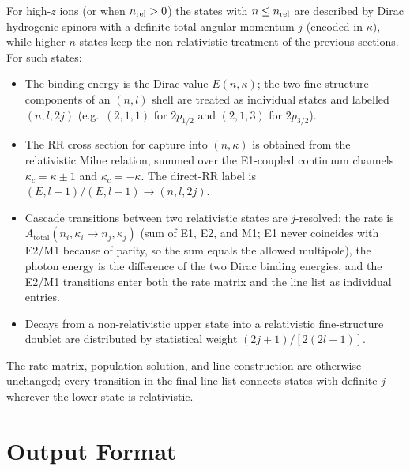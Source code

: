 \documentclass[11pt,a4paper]{article}
\begin{document}
For high-$z$ ions (or when $n_{\rm rel} > 0$) the states with
$n \le n_{\rm rel}$ are described by Dirac hydrogenic spinors with a
definite total angular momentum $j$ (encoded in $\kappa$), while
higher-$n$ states keep the non-relativistic treatment of the previous
sections.  For such states:
\begin{itemize}
\item The binding energy is the Dirac value $E(n,\kappa)$; the two
  fine-structure components of an $(n,l)$ shell are treated as
  individual states and labelled $(n,l,2j)$ (e.g.\ $(2,1,1)$ for
  $2p_{1/2}$ and $(2,1,3)$ for $2p_{3/2}$).
\item The RR cross section for capture into $(n,\kappa)$ is obtained
  from the relativistic Milne relation, summed over the E1-coupled
  continuum channels $\kappa_c = \kappa\pm1$ and $\kappa_c = -\kappa$.
  The direct-RR label is $(E,l{-}1)/(E,l{+}1) \to (n,l,2j)$.
\item Cascade transitions between two relativistic states are
  $j$-resolved: the rate is $A_{\text{total}}(n_i,\kappa_i \to
  n_j,\kappa_j)$ (sum of E1, E2, and M1; E1 never coincides with
  E2/M1 because of parity, so the sum equals the allowed multipole),
  the photon energy
  is the difference of the two Dirac binding energies, and the E2/M1
  transitions enter both the rate matrix and the line list as
  individual entries.
\item Decays from a non-relativistic upper state into a relativistic
  fine-structure doublet are distributed by statistical weight
  $(2j{+}1)/[2(2l{+}1)]$.
\end{itemize}

The rate matrix, population solution, and line construction are
otherwise unchanged; every transition in the final line list connects
states with definite $j$ wherever the lower state is relativistic.

\section{Output Format}
\end{document}
